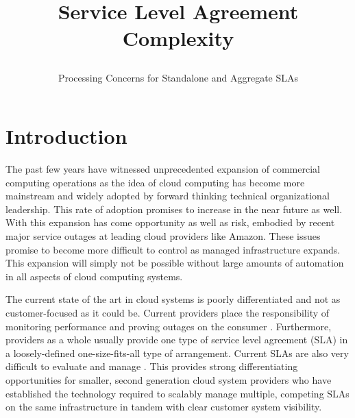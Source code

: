 \documentclass[a4paper,twoside]{article}
\begin{document}
\title{
Service Level Agreement Complexity  
\subtitle{Processing Concerns for Standalone and Aggregate SLAs}
}

\author{
}



\onecolumn \maketitle \normalsize \vfill

\section{Introduction}
The past few years have witnessed unprecedented expansion of commercial computing operations as the idea of cloud computing has become more mainstream and widely adopted by forward thinking technical organizational leadership.  This rate of adoption promises to increase in the near future as well.  With this expansion has come opportunity as well as risk, embodied by recent major service outages at leading cloud providers like Amazon.  These issues promise to become more difficult to control as managed infrastructure expands.  This expansion will simply not be possible without large amounts of automation in all aspects of cloud computing systems.

The current state of the art in cloud systems is poorly differentiated and not as customer-focused as it could be.  Current providers place the responsibility of monitoring performance and proving outages on the consumer \cite{ctrl:amazon-cloud-watch}.  Furthermore, providers as a whole usually provide one type of service level agreement (SLA) in a loosely-defined one-size-fits-all type of arrangement. Current SLAs are also very difficult to evaluate and manage \cite{Hilley-2009}.  This provides strong differentiating opportunities for smaller, second generation cloud system providers who have established the technology required to scalably manage multiple, competing SLAs on the same infrastructure in tandem with clear customer system visibility.
\end{document}
